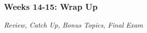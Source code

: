\documentclass[11pt, letterpaper]{article}
\begin{document}




%

%
%

\subsubsection*{Weeks 14-15: Wrap Up}
\textit{Review, Catch Up, Bonus Topics, Final Exam}


\end{document}

